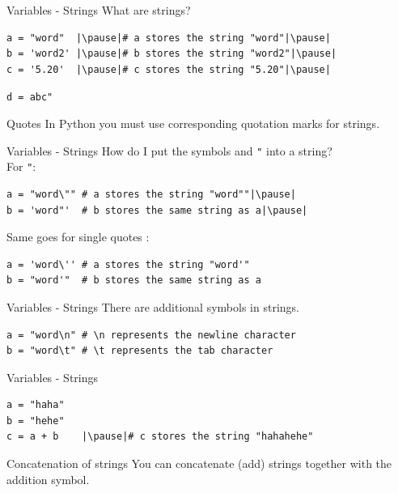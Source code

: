 \documentclass[dvipsnames, svgnames, x11names, handout]{beamer}
\begin{document}
\begin{frame}[fragile]{Variables - Strings}
What are strings?\pause\\

\begin{verbatim}
a = "word"  |\pause|# a stores the string "word"|\pause|
b = 'word2' |\pause|# b stores the string "word2"|\pause|
c = '5.20'  |\pause|# c stores the string "5.20"|\pause|
\end{verbatim}
\vspace{-0.275em}
\texttt{d = }{\color{BrickRed}\texttt{\textquotesingle abc"}}\pause {} \pause
\begin{block}{Quotes}
In Python you must use corresponding quotation marks for strings.
\end{block}
\end{frame}

\begin{frame}[fragile]{Variables - Strings}
How do I put the symbols \texttt{\textquotesingle} and \texttt{"} into a string?\pause\\
For \texttt{"}:\pause
	
\begin{verbatim}
a = "word\"" # a stores the string "word""|\pause|
b = 'word"'  # b stores the same string as a|\pause|
\end{verbatim}
\vspace{1em}
Same goes for single quotes \texttt{\textquotesingle}:
\begin{verbatim}
a = 'word\'' # a stores the string "word'"
b = "word'"  # b stores the same string as a
\end{verbatim}
\end{frame}

\begin{frame}[fragile]{Variables - Strings}
There are additional symbols in strings.
\begin{verbatim}
a = "word\n" # \n represents the newline character
b = "word\t" # \t represents the tab character
\end{verbatim}
\end{frame}

\begin{frame}[fragile]{Variables - Strings}
\begin{verbatim}
a = "haha"
b = "hehe"
c = a + b    |\pause|# c stores the string "hahahehe"
\end{verbatim}
\pause
\begin{block}{Concatenation of strings}
You can concatenate (add) strings together with the addition symbol.
\end{block}
\end{frame}
\end{document}
